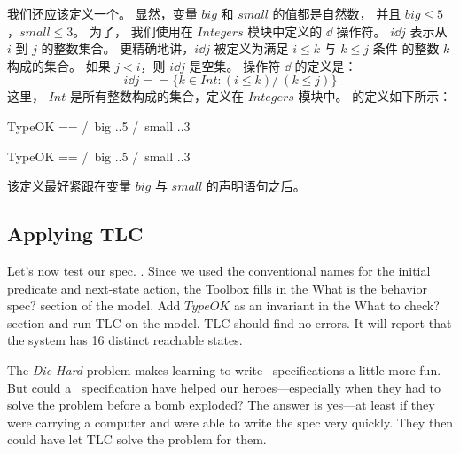 \begin{ch}
  我们还应该定义一个\tlatypeinvariant{}。
  显然，变量 $big$ 和 $small$ 的值都是自然数，
  并且 $big \leq 5$，$small \leq 3$。
  为了，
  我们使用在 $Integers$ 模块中定义的%
  $\dd$ 操作符。
  $i\dd j$ 表示从 $i$ 到 $j$ 的整数集合。
  更精确地讲，$i\dd j$ 被定义为满足 $i\leq k$ 与 $k\leq j$ 条件
  的整数 $k$ 构成的集合。
  如果 $j < i$，则 $i\dd j$ 是空集。
  操作符 $\dd$ 的定义是：
  \[ i \dd j == \{k \in Int : (i \leq k) /\ (k \leq j)\}
  \]
  这里， 
  $Int$ 是所有整数构成的集合，定义在 $Integers$ 模块中。
  \tlatypeinvariant{}的定义如下所示：
   \medskip
  \begin{twocols}
  \begin{notla}
  TypeOK == /\ big   ..5
            /\ small ..3 
  \end{notla}
  \begin{tlatex}
  \end{tlatex}
  \midcol
  \begin{verbatim*}
  TypeOK == /\ big   ..5
            /\ small ..3 
  \end{verbatim*}
  \end{twocols}
   \medskip
  该定义最好紧跟在变量 $big$ 与 $small$ 的声明语句之后。
\end{ch}
\subsection{Applying TLC}


Let's now test our spec.  .  Since we used the conventional names for the initial
predicate and next-state action, the Toolbox fills in the
\textsf{What is the behavior spec?} section of the model.  Add 
$TypeOK$ as an invariant in the \textsf{What to check?} section
and run TLC on the model.  TLC should find no errors.  It will 
report that the system has 16 distinct reachable states.

The \emph{Die Hard} problem makes learning to write \tlaplus\
specifications a little more fun.  But could a \tlaplus\ specification
have helped our heroes---especially when they had to solve the problem
before a bomb exploded?  The answer is yes---at least if they were
carrying a computer and were able to write the spec very quickly.
They then could have let TLC solve the problem for them.

